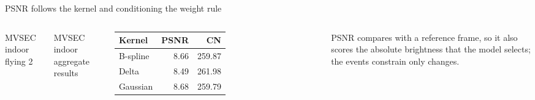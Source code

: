 \begin{frame}{PSNR follows the kernel and conditioning the weight rule}
\begin{columns}[c]
\small MVSEC~\cite{MVSEC2018} indoor flying 2\par\medskip
\hfill{}
\small MVSEC indoor aggregate results\par\medskip
\begin{tabular}{lrr}\toprule Kernel & PSNR & CN\\\midrule
B-spline & 8.66 & 259.87\\
Delta & 8.49 & 261.98\\
Gaussian & 8.68 & 259.79\\\bottomrule
\end{tabular}\par\smallskip
{\scriptsize PSNR compares with a reference frame, so it also scores the absolute brightness that the model selects; the events constrain only changes.\par}
\end{columns}

\end{frame}
